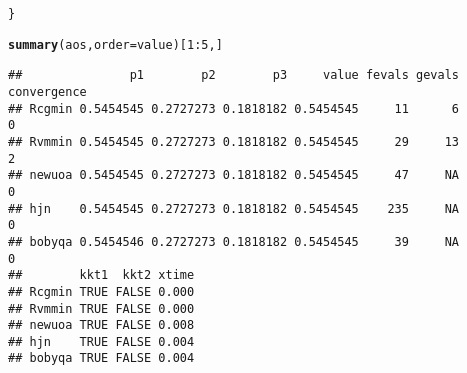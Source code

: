 \documentclass[11pt]{article}\usepackage[]{graphicx}\usepackage[]{color}
\makeatletter
\newcommand{\hlnum}[1]{\textcolor[rgb]{0.686,0.059,0.569}{#1}}%
\newcommand{\hlopt}[1]{\textcolor[rgb]{0,0,0}{#1}}%
\newcommand{\hlstd}[1]{\textcolor[rgb]{0.345,0.345,0.345}{#1}}%
\newcommand{\hlkwc}[1]{\textcolor[rgb]{0.333,0.667,0.333}{#1}}%
\newcommand{\hlkwd}[1]{\textcolor[rgb]{0.737,0.353,0.396}{\textbf{#1}}}%
\newenvironment{kframe}{%
 \def\at@end@of@kframe{}%
 \ifinner\ifhmode%
  \def\at@end@of@kframe{\end{minipage}}%
  \begin{minipage}{\columnwidth}%
 \fi\fi%
 \def\FrameCommand##1{\hskip\@totalleftmargin \hskip-\fboxsep
 \colorbox{shadecolor}{##1}\hskip-\fboxsep
     \hskip-\linewidth \hskip-\@totalleftmargin \hskip\columnwidth}%
 \MakeFramed {\advance\hsize-\width
   \@totalleftmargin\z@ \linewidth\hsize
   \@setminipage}}%
 {\par\unskip\endMakeFramed%
 \at@end@of@kframe}
\newenvironment{knitrout}{}{} %
\makeatother
\begin{document}
\begin{knitrout}
\begin{kframe}
\begin{alltt}
\hlstd{\}}

\hlkwd{summary}\hlstd{(aos,}\hlkwc{order}\hlstd{=value)[}\hlnum{1}\hlopt{:}\hlnum{5}\hlstd{,]}
\end{alltt}
\begin{verbatim}
##               p1        p2        p3     value fevals gevals convergence
## Rcgmin 0.5454545 0.2727273 0.1818182 0.5454545     11      6           0
## Rvmmin 0.5454545 0.2727273 0.1818182 0.5454545     29     13           2
## newuoa 0.5454545 0.2727273 0.1818182 0.5454545     47     NA           0
## hjn    0.5454545 0.2727273 0.1818182 0.5454545    235     NA           0
## bobyqa 0.5454546 0.2727273 0.1818182 0.5454545     39     NA           0
##        kkt1  kkt2 xtime
## Rcgmin TRUE FALSE 0.000
## Rvmmin TRUE FALSE 0.000
## newuoa TRUE FALSE 0.008
## hjn    TRUE FALSE 0.004
## bobyqa TRUE FALSE 0.004
\end{verbatim}
\end{kframe}
\end{knitrout}
\end{document}
